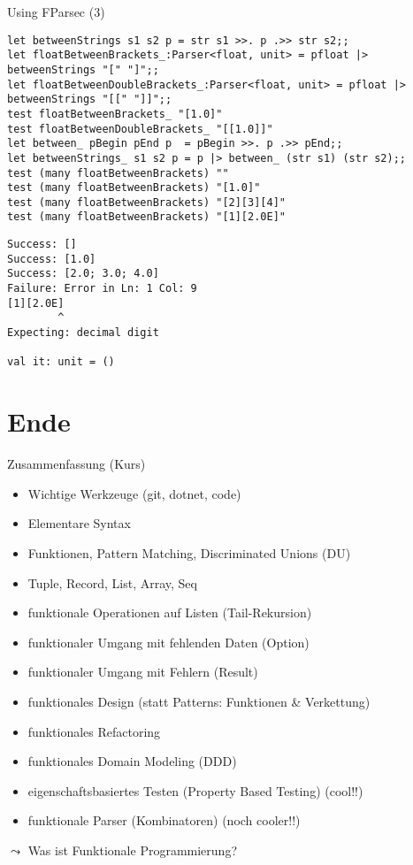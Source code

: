 \documentclass[t]{beamer}
\begin{document}
\begin{frame}[label={sec:org9ef280b},fragile]{Using FParsec (3)}
 \begin{verbatim}
let betweenStrings s1 s2 p = str s1 >>. p .>> str s2;;
let floatBetweenBrackets_:Parser<float, unit> = pfloat |> betweenStrings "[" "]";;
let floatBetweenDoubleBrackets_:Parser<float, unit> = pfloat |> betweenStrings "[[" "]]";;
test floatBetweenBrackets_ "[1.0]"
test floatBetweenDoubleBrackets_ "[[1.0]]"
let between_ pBegin pEnd p  = pBegin >>. p .>> pEnd;;
let betweenStrings_ s1 s2 p = p |> between_ (str s1) (str s2);;
test (many floatBetweenBrackets) ""
test (many floatBetweenBrackets) "[1.0]"
test (many floatBetweenBrackets) "[2][3][4]"
test (many floatBetweenBrackets) "[1][2.0E]"
\end{verbatim}

\begin{verbatim}
Success: []                             
Success: [1.0]                          
Success: [2.0; 3.0; 4.0]                
Failure: Error in Ln: 1 Col: 9
[1][2.0E]
        ^
Expecting: decimal digit

val it: unit = ()
\end{verbatim}
\end{frame}

\section{Ende }
\label{sec:orgd52857a}
\begin{frame}[label={sec:org00f27f4}]{Zusammenfassung (Kurs)}
\begin{itemize}
\item Wichtige Werkzeuge (git, dotnet, code)
\item Elementare Syntax
\item Funktionen, Pattern Matching, Discriminated Unions (DU)
\item Tuple, Record, List, Array, Seq
\item funktionale Operationen auf Listen (Tail-Rekursion)
\item funktionaler Umgang mit fehlenden Daten (Option)
\item funktionaler Umgang mit Fehlern (Result)
\item funktionales Design (statt Patterns: Funktionen \& Verkettung)
\item funktionales Refactoring
\item funktionales Domain Modeling (DDD)
\item eigenschaftsbasiertes Testen (Property Based Testing) (cool!!)
\item funktionale Parser (Kombinatoren) (noch cooler!!)
\end{itemize}
\(\leadsto\) \alert{\alert{Was ist Funktionale Programmierung?}}
\end{frame}
\end{document}
